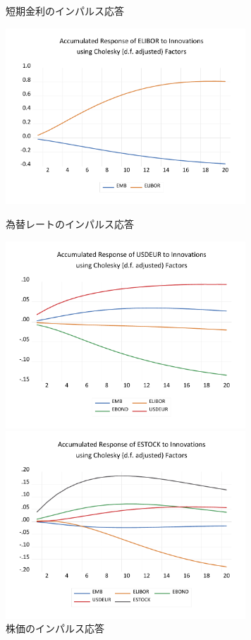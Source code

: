 \documentclass[12pt]{jarticle}
\begin{document}
{\newpage
\begin{figure}[!htbp]
  \begin{minipage}{0.5\hsize}
    \caption{短期金利のインパルス応答}
    \begin{center}
      \includegraphics[width=9cm]{ielibor.pdf}
    \end{center}
  \end{minipage}
  \begin{minipage}{0.5\hsize}
    \caption{為替レートのインパルス応答}
    \begin{center}
      \includegraphics[width=9cm]{ierate.pdf}
    \end{center}
  \end{minipage}
  \begin{minipage}{0.5\hsize}
    \caption{株価のインパルス応答}
    \begin{center}
      \includegraphics[width=9cm]{iestock.pdf}

\end{center}
\end{minipage}
\end{figure}}
\end{document}
